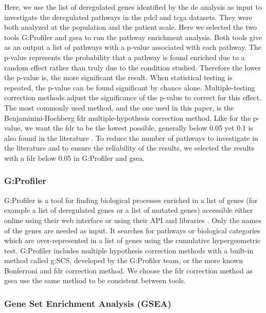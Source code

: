 Here, we use the list of deregulated genes identified by the \acrlong{de} analysis as input to investigate the deregulated pathways in the \acrshort{pdcl} and \acrshort{tcga} datasets.
They were both analyzed at the population and the patient scale.
Here we selected the two tools G:Profiler and \acrfull{gsea} to run the pathway enrichment analysis.
Both tools give as an output a list of pathways with a p-value associated with each pathway.
The p-value represents the probability that a pathway is found enriched due to a random effect rather than truly due to the condition studied.
Therefore the lower the p-value is, the more significant the result.
When statistical testing is repeated, the p-value can be found significant by chance alone.
Multiple-testing correction methods adjust the significance of the p-value to correct for this effect.
The most commonly used method, and the one used in this paper, is the Benjaminini-Hochberg \acrfull{fdr} multiple-hypothesis correction method.
Like for the p-value, we want the \acrshort{fdr} to be the lowest possible, generally below 0.05 yet 0.1 is also found in the literature \cite*{Reimand2019}.
To reduce the number of pathways to investigate in the literature and to ensure the reliability of the results, we selected the results with a \acrshort{fdr} below 0.05 in G:Profiler and \acrshort{gsea}.

\subsubsection{G:Profiler}
G:Profiler is a tool for finding biological processes enriched in a list of genes (for example a list of deregulated genes or a list of mutated genes) accessible either online using their web interface or using their API and libraries \cite*{Raudvere2019}.
Only the names of the genes are needed as input.
It searches for pathways or biological categories which are over-represented in a list of genes using the cumulative hypergeometric test.
G:Profiler includes multiple hypothesis correction methods with a built-in method called g:SCS, developed by the G:Profiler team, or the more known Bonferroni and \acrshort{fdr} correction method.
We choose the \acrshort{fdr} correction method as \acrshort{gsea} use the same method to be consistent between tools.

\subsubsection{Gene Set Enrichment Analysis (GSEA)}

